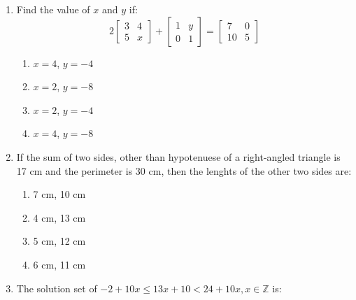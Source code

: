\begin{enumerate}[label=(\roman*)]
    \item Find the value of $x$ and $y$ if:
        \[
            2 \begin{bmatrix*} 3 & 4 \\ 5 & x \end{bmatrix*} + 
              \begin{bmatrix*} 1 & y \\ 0 & 1 \end{bmatrix*} = 
              \begin{bmatrix*} 7 & 0 \\ 10 & 5 \end{bmatrix*}
        \]

        \begin{multicols}{2}
        \begin{enumerate}[label=(\alph*)]
            \item $x=4$, $y=-4$ 
            \item $x=2$, $y=-8$ 
            \item $x=2$, $y=-4$ 
            \item $x=4$, $y=-8$ 
        \end{enumerate}
        \end{multicols}

    \item If the sum of two sides, other than hypotenuese of a 
        right-angled triangle is 17 cm and the perimeter is 
        30 cm, then the lenghts of the other two sides are:

        \begin{multicols}{2}
        \begin{enumerate}[label=(\alph*)]
            \item 7 cm, 10 cm 
            \item 4 cm, 13 cm 
            \item 5 cm, 12 cm 
            \item 6 cm, 11 cm 
        \end{enumerate}
        \end{multicols}

    \item The solution set of $-2 + 10x \leq 13x + 10 < 24 + 10x, x \in \mathbb{Z}$ 
        is:


\end{enumerate}
